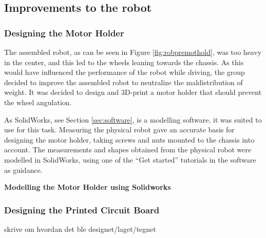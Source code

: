 \subsection{Improvements to the robot}

\subsubsection{Designing the Motor Holder}
The assembled robot, as can be seen in Figure \ref{fig:robpremothold}, was too heavy in the center, and this led to the wheels leaning towards the chassis. As this would have influenced the performance of the robot while driving, the group decided to improve the assembled robot to neutralize the maldistribution of weight. It was decided to design and 3D-print a motor holder that should prevent the wheel angulation.

As SolidWorks, see Section \ref{sec:software}, is a modelling software, it was suited to use for this task. Measuring the physical robot gave an accurate basis for designing the motor holder, taking screws and nuts mounted to the chassis into account. The measurements and shapes obtained from the physical robot were modelled in SolidWorks, using one of the ``Get started'' tutorials in the software as guidance.

\textbf{Modelling the Motor Holder using Solidworks}



\subsubsection{Designing the Printed Circuit Board}
skrive om hvordan det ble designet/laget/tegnet